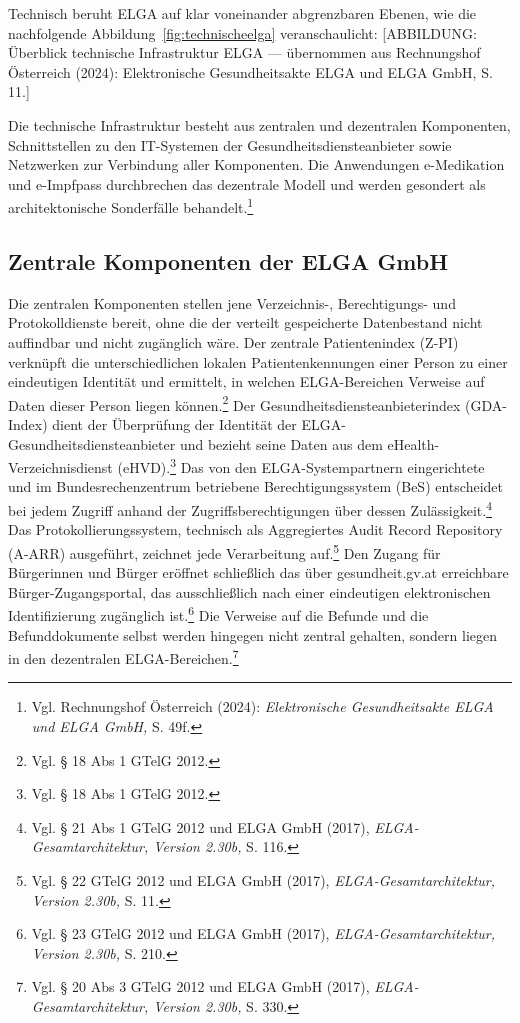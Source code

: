 Technisch beruht ELGA auf klar voneinander abgrenzbaren Ebenen, wie die nachfolgende Abbildung~\ref{fig:technischeelga} veranschaulicht:
[ABBILDUNG: Überblick technische Infrastruktur ELGA — übernommen aus Rechnungshof Österreich (2024): Elektronische Gesundheitsakte ELGA und ELGA GmbH, S. 11.]

Die technische Infrastruktur besteht aus zentralen und dezentralen Komponenten, Schnittstellen zu den IT-Systemen der Gesundheitsdiensteanbieter sowie Netzwerken zur Verbindung aller Komponenten. Die Anwendungen e-Medikation und e-Impfpass durchbrechen das dezentrale Modell und werden gesondert als architektonische Sonderfälle behandelt.\footnote{Vgl. Rechnungshof Österreich (2024): \textit{Elektronische Gesundheitsakte ELGA und ELGA GmbH,} S. 49f.}

    \subsection{Zentrale Komponenten der ELGA GmbH}
Die zentralen Komponenten stellen jene Verzeichnis-, Berechtigungs- und Protokolldienste bereit, ohne die der verteilt gespeicherte Datenbestand nicht auffindbar und nicht zugänglich wäre. Der zentrale Patientenindex (Z-PI) verknüpft die unterschiedlichen lokalen Patientenkennungen einer Person zu einer eindeutigen Identität und ermittelt, in welchen ELGA-Bereichen Verweise auf Daten dieser Person liegen können.\footnote{Vgl. § 18 Abs 1 GTelG 2012.} Der Gesundheitsdiensteanbieterindex (GDA-Index) dient der Überprüfung der Identität der ELGA-Gesundheitsdiensteanbieter und bezieht seine Daten aus dem eHealth-Verzeichnisdienst (eHVD).\footnote{Vgl. § 18 Abs 1 GTelG 2012.} Das von den ELGA-Systempartnern eingerichtete und im Bundesrechenzentrum betriebene Berechtigungssystem (BeS) entscheidet bei jedem Zugriff anhand der Zugriffsberechtigungen über dessen Zulässigkeit.\footnote{Vgl. § 21 Abs 1 GTelG 2012 und ELGA GmbH (2017), \textit{ELGA-Gesamtarchitektur, Version 2.30b,} S. 116.} Das Protokollierungssystem, technisch als Aggregiertes Audit Record Repository (A-ARR) ausgeführt, zeichnet jede Verarbeitung auf.\footnote{Vgl. § 22 GTelG 2012 und ELGA GmbH (2017), \textit{ELGA-Gesamtarchitektur, Version 2.30b,} S. 11.} Den Zugang für Bürgerinnen und Bürger eröffnet schließlich das über gesundheit.gv.at erreichbare Bürger-Zugangsportal, das ausschließlich nach einer eindeutigen elektronischen Identifizierung zugänglich ist.\footnote{Vgl. § 23 GTelG 2012 und ELGA GmbH (2017), \textit{ELGA-Gesamtarchitektur, Version 2.30b,} S. 210.} Die Verweise auf die Befunde und die Befunddokumente selbst werden hingegen nicht zentral gehalten, sondern liegen in den dezentralen ELGA-Bereichen.\footnote{Vgl. § 20 Abs 3 GTelG 2012 und ELGA GmbH (2017), \textit{ELGA-Gesamtarchitektur, Version 2.30b,} S. 330.}

